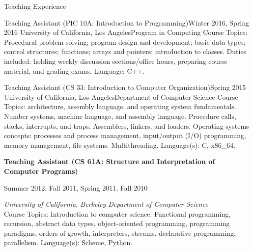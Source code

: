 \documentclass{resume}
\begin{document}
\begin{component}{Teaching Experience}
  \begin{position}{Teaching Assistant (PIC 10A: Introduction to Programming)}{Winter 2016, Spring 2016}
    {University of California, Los Angeles}{Program in Computing}
    {Course Topics: Procedural problem solving; program design and development; basic data types; control structures; functions; arrays and pointers; introduction to classes. Duties included: holding weekly discussion sections/office hours, preparing course material, and grading exams. Language: C++.}
  \end{position}

  \begin{position}{Teaching Assistant (CS 33: Introduction to Computer Organization)}{Spring 2015}
    {University of California, Los Angeles}{Department of Computer Science}
    {Course Topics: architecture, assembly language, and operating system fundamentals. Number systems, machine language, and assembly language. Procedure calls, stacks, interrupts, and traps. Assemblers, linkers, and loaders. Operating systems concepts: processes and process management, input/output (I/O) programming, memory management, file systems. Multithreading. Language(s): C, x86\_64.}
  \end{position}

    \textbf{Teaching Assistant (CS 61A: Structure and Interpretation of Computer Programs)}
\vspace{-0.7em}
\begin{flushright}Summer 2012, Fall 2011, Spring 2011, Fall 2010\end{flushright}
\vspace{-0.7em}
        \textit{University of California, Berkeley \hfill Department of Computer Science}\\
    {Course Topics: Introduction to computer science. Functional programming, recursion, abstract data types, object-oriented programming, programming paradigms, orders of growth, interpreters, streams, declarative programming, parallelism. Language(s): Scheme, Python.}
\\


\end{component}
\end{document}

